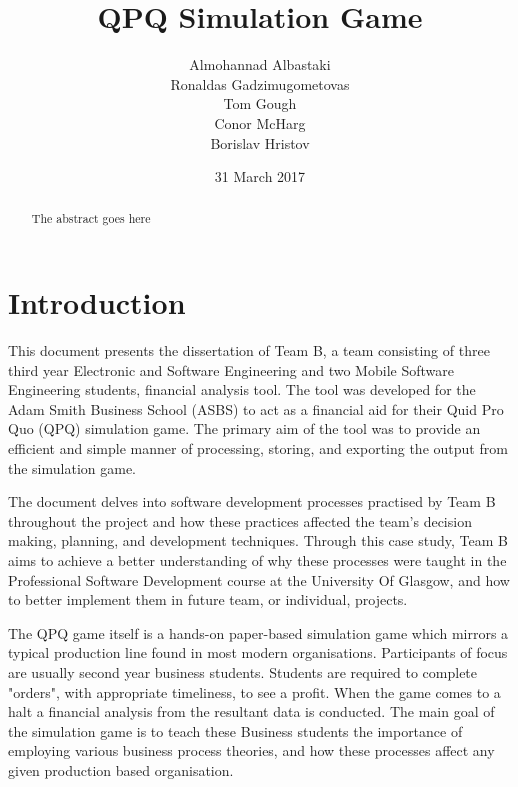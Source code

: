 \documentclass{l3proj}
\begin{document}
\title{QPQ Simulation Game}

\author{Almohannad Albastaki \\
        Ronaldas Gadzimugometovas \\
        Tom Gough \\
     	Conor McHarg \\
        Borislav Hristov}

\date{31 March 2017}

\maketitle

\begin{abstract}

The abstract goes here

\end{abstract}

\educationalconsent

\newpage

\section{Introduction}
\label{sec:introduction}

This document presents the dissertation of Team B, a team consisting of three third year Electronic and Software Engineering and two Mobile Software Engineering students, financial analysis tool. The tool was developed for the Adam Smith Business School (ASBS) to act as a financial aid for their Quid Pro Quo (QPQ) simulation game. The primary aim of the tool was to provide an efficient and simple manner of processing, storing, and exporting the output from the simulation game.

The document delves into software development processes practised by Team B throughout the project and how these practices affected the team's decision making, planning, and development techniques. Through this case study, Team B aims to achieve a better understanding of why these processes were taught in the Professional Software Development course at the University Of Glasgow, and how to better implement them in future team, or individual, projects.

The QPQ game itself is a hands-on paper-based simulation game which mirrors a typical production line found in most modern organisations. Participants of focus are usually second year business students. Students are required to complete "orders", with appropriate timeliness, to see a profit. When the game comes to a halt a financial analysis from the resultant data is conducted. The main goal of the simulation game is to teach these Business students the importance of employing various business process theories, and how these processes affect any given production based organisation.  
\end{document}
